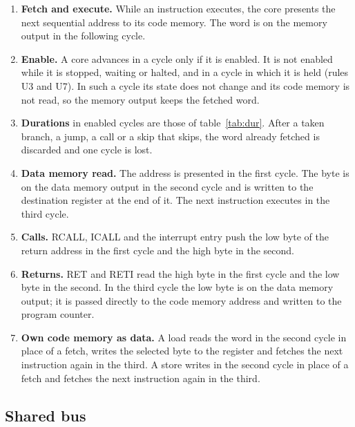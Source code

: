 \documentclass[10pt,a4paper]{article}
\begin{document}
\begin{enumerate}[label=\textbf{P\arabic*},leftmargin=2.6em]
\item \textbf{Fetch and execute.} While an instruction executes, the core presents the next sequential address to
its code memory. The word is on the memory output in the following cycle.
\item \textbf{Enable.} A core advances in a cycle only if it is enabled. It is not enabled while it is stopped,
waiting or halted, and in a cycle in which it is held (rules U3 and U7). In such a cycle its state does not
change and its code memory is not read, so the memory output keeps the fetched word.
\item \textbf{Durations} in enabled cycles are those of table~\ref{tab:dur}. After a taken branch, a jump, a call
or a skip that skips, the word already fetched is discarded and one cycle is lost.
\item \textbf{Data memory read.} The address is presented in the first cycle. The byte is on the data memory
output in the second cycle and is written to the destination register at the end of it. The next instruction
executes in the third cycle.
\item \textbf{Calls.} RCALL, ICALL and the interrupt entry push the low byte of the return address in the first
cycle and the high byte in the second.
\item \textbf{Returns.} RET and RETI read the high byte in the first cycle and the low byte in the second. In the
third cycle the low byte is on the data memory output; it is passed directly to the code memory address and
written to the program counter.
\item \textbf{Own code memory as data.} A load reads the word in the second cycle in place of a fetch, writes the
selected byte to the register and fetches the next instruction again in the third. A store writes in the second cycle in place of a fetch and fetches the next instruction again in the third.
\end{enumerate}

\subsection{Shared bus}
\end{document}
